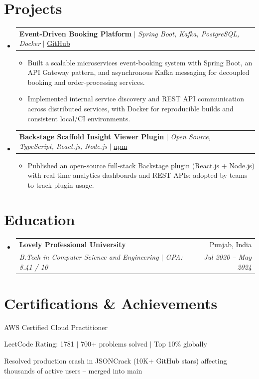 \documentclass[letterpaper,10.5pt]{article}
\makeatletter
\newcommand{\resumeItem}[1]{
  \item\small{#1\vspace{-3pt}}
}
\newcommand{\resumeSubheading}[4]{
  \vspace{-2pt}\item
    \begin{tabular*}{0.97\textwidth}[t]{l@{\extracolsep{\fill}}r}
      \textbf{#1} & \small #2 \\
      \textit{\small#3} & \textit{\small #4} \\
    \end{tabular*}\vspace{-4pt}
}
\newcommand{\resumeProjectHeading}[2]{
  \item
    \begin{tabular*}{0.97\textwidth}{l@{\extracolsep{\fill}}r}
      \small#1 & \small #2 \\
    \end{tabular*}\vspace{-6pt}
}
\newcommand{\resumeSubHeadingListStart}{\begin{itemize}[leftmargin=0.15in, label={}]}
\newcommand{\resumeSubHeadingListEnd}{\end{itemize}}
\newcommand{\resumeItemListStart}{\begin{itemize}[leftmargin=0.2in]\vspace{-2pt}}
\newcommand{\resumeItemListEnd}{\end{itemize}\vspace{-3pt}}
\makeatother
\begin{document}
\section{Projects}
\resumeSubHeadingListStart

  \resumeProjectHeading
    {\textbf{Event-Driven Booking Platform} $|$ \textit{Spring Boot, Kafka, PostgreSQL, Docker} $|$ \href{https://github.com/Prateek-Wayne/event-booking-system}{GitHub}}{}
    \resumeItemListStart
      \resumeItem{Built a scalable microservices event-booking system with Spring Boot, an API Gateway pattern, and asynchronous Kafka messaging for decoupled booking and order-processing services.}
      \resumeItem{Implemented internal service discovery and REST API communication across distributed services, with Docker for reproducible builds and consistent local/CI environments.}
      \resumeItemListEnd

  \vspace{6pt}
  \resumeProjectHeading
    {\textbf{Backstage Scaffold Insight Viewer Plugin} $|$ \textit{Open Source, TypeScript, React.js, Node.js} $|$ \href{https://www.npmjs.com/package/@prateek-wayne/backstage-plugin-scaffold-insight}{npm}}{}
    \resumeItemListStart
      \resumeItem{Published an open-source full-stack Backstage plugin (React.js + Node.js) with real-time analytics dashboards and REST APIs; adopted by teams to track plugin usage.}
    \resumeItemListEnd

\resumeSubHeadingListEnd

\section{Education}
\resumeSubHeadingListStart
  \resumeSubheading
    {Lovely Professional University}{Punjab, India}
    {B.Tech in Computer Science and Engineering \textnormal{$|$ GPA: 8.41 / 10}}{Jul 2020 -- May 2024}
\resumeSubHeadingListEnd

\section{Certifications \& Achievements}
\begin{itemize}[leftmargin=0.15in, label={}, itemsep=0pt]
  \small{
    \item AWS Certified Cloud Practitioner
    \item LeetCode Rating: 1781 $|$ 700+ problems solved $|$ Top 10\% globally
    \item Resolved production crash in JSONCrack (10K+ GitHub stars) affecting thousands of active users -- merged into main
  }
\end{itemize}
\end{document}
